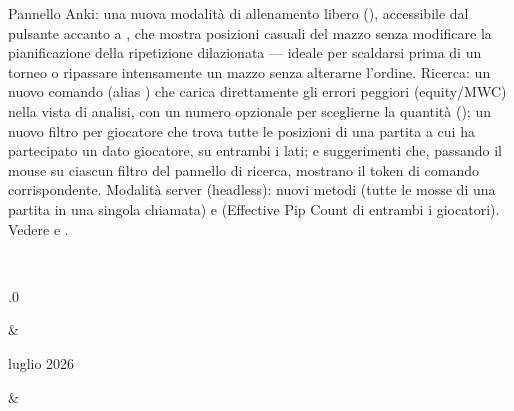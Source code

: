 \documentclass[letterpaper,10pt,italian]{sphinxmanual}
\begin{document}
\begin{savenotes}
\begin{longtable}{}
\begin{varwidth}[t]{}
Pannello Anki: una nuova modalità di allenamento libero (), accessibile dal pulsante  accanto a , che mostra posizioni casuali del mazzo senza modificare la pianificazione della ripetizione dilazionata — ideale per scaldarsi prima di un torneo o ripassare intensamente un mazzo senza alterarne l’ordine. Ricerca: un nuovo comando  (alias ) che carica direttamente gli errori peggiori (equity/MWC) nella vista di analisi, con un numero opzionale per sceglierne la quantità (); un nuovo filtro per giocatore  che trova tutte le posizioni di una partita a cui ha partecipato un dato giocatore, su entrambi i lati; e suggerimenti che, passando il mouse su ciascun filtro del pannello di ricerca, mostrano il token di comando corrispondente. Modalità server (headless): nuovi metodi  (tutte le mosse di una partita in una singola chiamata) e  (Effective Pip Count di entrambi i giocatori). Vedere {\hyperref[\detokenize{manuel:panneau-anki}]{}} e {\hyperref[\detokenize{cmd_mode:cmd-mode}]{}}.
\sphinxbeforeendvarwidth
\end{varwidth}%
\\
\sphinxhline\begin{varwidth}[t]{}
.0
\sphinxbeforeendvarwidth
\end{varwidth}%
&\begin{varwidth}[t]{}
 luglio 2026
\sphinxbeforeendvarwidth
\end{varwidth}%
&\begin{varwidth}[t]{}
\sphinxAtStartPar

\end{varwidth}
\end{longtable}
\end{savenotes}
\end{document}
